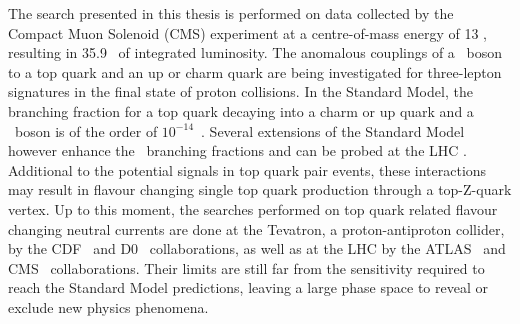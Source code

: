 


The search presented in this thesis is performed on data collected by the Compact Muon Solenoid (CMS) experiment at a centre-of-mass energy of 13 \TeV, resulting in 35.9 \fbinv\ of integrated luminosity. The anomalous couplings of a \PZ\ boson to a top quark and an up or charm quark are being investigated for three-lepton signatures in the final state of proton collisions. In the Standard Model, the branching fraction for a top quark decaying into a charm or up quark and a \PZ\ boson is of the order of $10^{-14}$~\cite{AguilarSaavedra:2004wm,PhysRevD.2.1285}. Several extensions of the Standard Model however enhance the \FCNC\ branching fractions and can be probed at the LHC \cite{AguilarSaavedra:2004wm}. Additional to the potential signals in top quark pair events, these interactions may result in flavour changing single top quark production through a top-Z-quark vertex.  Up to this moment,  the searches performed on top quark related flavour changing neutral currents are done at the  Tevatron, a proton-antiproton collider, by the CDF~\cite{PhysRevLett.101.192002} and D0~\cite{Abazov:2010qk} collaborations, as well as at the LHC by the ATLAS~\cite{Aad:2015uza,Aad:2015gea} and CMS~\cite{Sirunyan:2017kkr,Chatrchyan:2013nwa,Khachatryan:2015att,Sirunyan:2017kkr}  collaborations. Their limits are still far from the sensitivity required to reach the Standard Model predictions,  leaving a large phase space to reveal or exclude new physics phenomena. 


